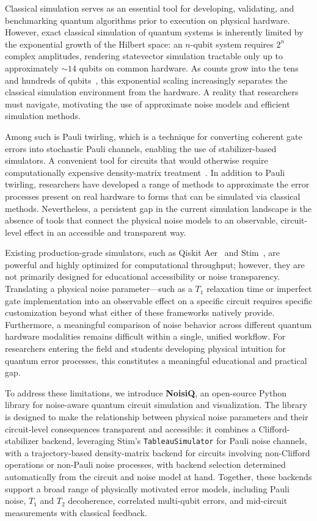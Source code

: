 \documentclass[10pt,twocolumn]{article}
\begin{document}
Classical simulation serves as an essential tool for developing, validating,
and benchmarking quantum algorithms prior to execution on physical hardware.
However, exact classical simulation of quantum systems is inherently limited
by the exponential growth of the Hilbert space: an $n$-qubit system requires
$2^n$ complex amplitudes, rendering statevector simulation tractable only up
to approximately $\sim 14$ qubits on common hardware.
As counts grow into the tens and
hundreds of qubits~\cite{arute2019quantum, ibm2023condor}, this exponential scaling
increasingly separates the classical simulation environment from the hardware. A reality that researchers must navigate, motivating the use of approximate noise models and efficient simulation methods.

Among such is Pauli twirling, which is a
technique for converting coherent gate errors into stochastic Pauli channels,
enabling the use of stabilizer-based simulators. A convenient tool for circuits that
would otherwise require computationally expensive density-matrix
treatment~\cite{cai2019constructing, hashim2021randomized}.
In addition to Pauli twirling, researchers have developed a range of methods to approximate
the error processes present on real hardware to forms that can be simulated via classical methods.
Nevertheless, a persistent gap in the current simulation landscape is the
absence of tools that connect the physical noise models to an
observable, circuit-level effect in an accessible and transparent way.

Existing production-grade simulators, such as Qiskit
Aer~\cite{qiskit2024} and Stim~\cite{stim2021}, are powerful and
highly optimized for computational throughput; however, they are not
primarily designed for educational accessibility or noise transparency.
Translating a physical noise parameter—such as a $T_1$ relaxation time or imperfect gate implementation into an observable effect on a specific circuit
requires specific customization beyond what either of these frameworks natively provide.
Furthermore, a meaningful comparison of noise behavior across different quantum
hardware modalities remains difficult within a single, unified workflow.
For researchers entering the field and students developing physical intuition
for quantum error processes, this constitutes a meaningful educational and
practical gap.

To address these limitations, we introduce \textbf{NoisiQ}, an open-source Python library for noise-aware quantum circuit simulation and visualization. The library is designed to make the relationship between physical noise parameters and their circuit-level consequences transparent and accessible: it combines a Clifford-stabilizer backend, leveraging Stim's \texttt{TableauSimulator} for Pauli noise channels, with a trajectory-based density-matrix backend for circuits involving non-Clifford operations or non-Pauli noise processes, with backend selection determined automatically from the circuit and noise model at hand. Together, these backends support a broad range of physically motivated error models, including Pauli noise, $T_1$ and $T_2$ decoherence, correlated multi-qubit errors, and mid-circuit measurements with classical feedback.
\end{document}
